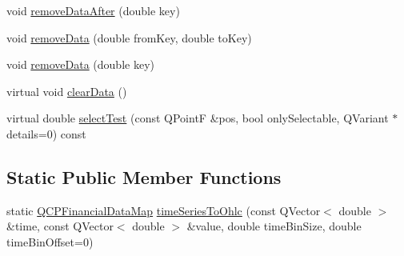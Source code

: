 \begin{DoxyCompactItemize}
\item 
void \hyperlink{class_q_c_p_financial_aa0fcd357005288c833a230c7874825ba}{remove\+Data\+After} (double key)
\item 
void \hyperlink{class_q_c_p_financial_a048c741d3c8cc5709c2c44b759fdf27c}{remove\+Data} (double from\+Key, double to\+Key)
\item 
void \hyperlink{class_q_c_p_financial_ae527d8a11290906b083d1ab598c380ea}{remove\+Data} (double key)
\item 
virtual void \hyperlink{class_q_c_p_financial_a11fd49928c33e55e27b7319c6927864a}{clear\+Data} ()
\item 
virtual double \hyperlink{class_q_c_p_financial_a77bffad8f3fcbcccbef03ead1c538e3a}{select\+Test} (const Q\+PointF \&pos, bool only\+Selectable, Q\+Variant $\ast$details=0) const
\end{DoxyCompactItemize}
\subsection*{Static Public Member Functions}
\begin{DoxyCompactItemize}
\item 
static \hyperlink{qcustomplot_8h_a745c09823fae0974b50beca9bc3b3d7d}{Q\+C\+P\+Financial\+Data\+Map} \hyperlink{class_q_c_p_financial_a0c3453d1c03e320950fdd2df54e3ebc8}{time\+Series\+To\+Ohlc} (const Q\+Vector$<$ double $>$ \&time, const Q\+Vector$<$ double $>$ \&value, double time\+Bin\+Size, double time\+Bin\+Offset=0)
\end{DoxyCompactItemize}
